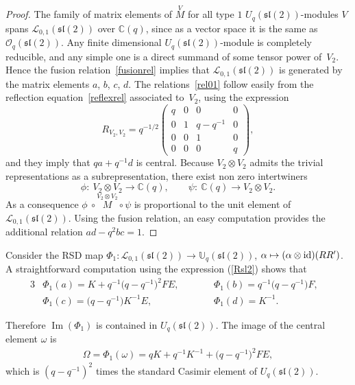\documentclass[pdftex]{sigma}%
\numberwithin{equation}{section}
\numberwithin{figure}{section}
\newcommand{\Oq}{\Oo_{q}}
\newcommand{\mUq}{\mathbb{U}_q}
\newcommand{\mc}{\mathbb{C}}
\newcommand{\Ll}{{\mathcal L}}
\newcommand{\Oo}{{\mathcal O}}
\newcommand{\ra}{\rightarrow}
\begin{document}
\begin{proof} The family of matrix elements of $\stackrel{V}{M}$ for all type $1$ $U_q({\mathfrak{sl}}(2))$-modules $V$ spans $\Ll_{0,1}({\mathfrak{sl}}(2))$ over $\mc(q)$, since as a vector space it is the same as $\Oq({\mathfrak{sl}}(2))$. Any finite dimensional $U_q({\mathfrak{sl}}(2))$-module is completely reducible, and any simple one is a direct summand of some tensor power of~$V_2$. Hence the fusion relation~\eqref{fusionrel} implies that $\Ll_{0,1}({\mathfrak{sl}}(2))$ is generated by the matrix elements $a$, $b$, $c$, $d$. The relations~\eqref{rel01} follow easily from the reflection equation~\eqref{reflexrel} associated to~$V_2$, using the expression
 \[
 R_{V_2 ,V_2}=q^{-1/2}\begin{pmatrix} q &0 &0& 0\\0& 1&q-q^{-1}&0\\0&0&1&0\\0&0&0&q \end{pmatrix}\!, \] and they imply that $qa+q^{-1}d$ is central.
Because $V_2\otimes V_2$ admits the trivial representations as a subrepresentation, there exist non zero intertwiners
\[
\phi\colon \ V_2\otimes V_2\rightarrow \mc(q) , \qquad \psi\colon \ \mc(q)\rightarrow V_2\otimes V_2.
\]
As a consequence $\phi \ \circ \stackrel{V_2\otimes V_2}{M}\circ \psi$ is proportional to the unit element of $\Ll_{0,1}({\mathfrak{sl}}(2))$. Using the fusion relation, an easy computation provides the additional relation $ad-q^2bc=1$.
\end{proof}

Consider the RSD map $\Phi_1\colon \Ll_{0,1}({\mathfrak{sl}}(2))\ra \mUq({\mathfrak{sl}}(2))$, $\alpha \mapsto (\alpha\otimes {\rm id} )(RR')$. A straightforward computation using the expression (\ref{Rsl2}) shows that
\begin{alignat}{3}
& \Phi_1(a) = K+q^{-1}\big(q-q^{-1}\big)^2 FE,\qquad && \Phi_1(b)= q^{-1}\big(q-q^{-1}\big) F,&\nonumber\\
& \Phi_1(c) = \big(q-q^{-1}\big) K^{-1}E,\qquad && \Phi_1(d)= K^{-1}.&\label{phigen}
\end{alignat}

Therefore $\operatorname{Im}(\Phi_1)$ is contained in $U_q({\mathfrak{sl}}(2))$. The image of the central element $\omega$ is
\begin{gather}\label{omega}
\Omega = \Phi_1(\omega) = qK+q^{-1}K^{-1}+\big(q-q^{-1}\big)^2FE,
\end{gather}
which is $(q-q^{-1})^2$ times the standard Casimir element of $U_q({\mathfrak{sl}}(2))$.
\end{document}
